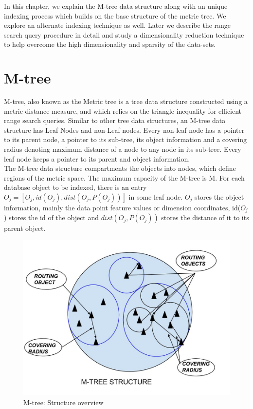 
In this chapter, we explain the M-tree data structure along with an unique indexing process which builds on the base structure of the metric tree. We explore an alternate indexing technique as well. Later we describe the range search query procedure in detail and study a dimensionality reduction technique to help overcome the high dimensionality and sparsity of the data-sets. \\


\section{M-tree}
M-tree, also known as the Metric tree is a tree data structure constructed using a metric distance measure, and which relies on the triangle inequality for efficient range search queries. Similar to other tree data structures, an M-tree data structure has Leaf Nodes and non-Leaf nodes. Every non-leaf node has a pointer to its parent node, a pointer to its sub-tree, its object information and a covering radius denoting maximum distance of a node to any node in its sub-tree. Every leaf node keeps a pointer to its parent and object information.\\

The M-tree data structure compartments the objects into nodes, which define regions of the metric space. The maximum capacity of the M-tree is M. For each database object to be indexed, there is an entry $O_j = [ O_j, id(O_j), dist(O_j , P(O_j )) ]$
in some leaf node.  $O_j$ stores the object information, mainly the data point feature values or dimension coordinates, id($O_j$) stores the id of the object and $dist(O_j , P(O_j ))$ stores the distance of it to its parent object. \\

\begin{figure}[ht]	
\centering
\includegraphics[width=0.7 \columnwidth]{img/mtree.jpg}
\caption{M-tree: Structure overview}
\label{fig:4.0}
\end{figure}

